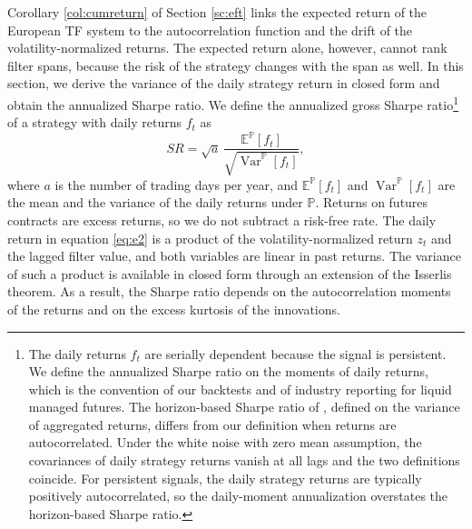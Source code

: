 \documentclass[hidelinks]{siamonline250211}
\DeclareMathOperator{\Var}{Var}
\begin{document}
Corollary \ref{col:cumreturn} of Section \ref{sc:eft} links the expected return of the European TF system to the autocorrelation function and the drift of the volatility-normalized returns. The expected return alone, however, cannot rank filter spans, because the risk of the strategy changes with the span as well. In this section, we derive the variance of the daily strategy return in closed form and obtain the annualized Sharpe ratio. We define the annualized gross Sharpe ratio\footnote{The daily returns $f_{t}$ are serially dependent because the signal is persistent. We define the annualized Sharpe ratio on the moments of daily returns, which is the convention of our backtests and of industry reporting for liquid managed futures. The horizon-based Sharpe ratio of \cite{Lo2002}, defined on the variance of aggregated returns, differs from our definition when returns are autocorrelated. Under the white noise with zero mean assumption, the covariances of daily strategy returns vanish at all lags and the two definitions coincide. For persistent signals, the daily strategy returns are typically positively autocorrelated, so the daily-moment annualization overstates the horizon-based Sharpe ratio.} of a strategy with daily returns $f_{t}$ as
\begin{equation} \label{eq:sr_def}
	SR = \sqrt{a} \, \frac{\mathbb{E}^{\mathbb{P}}[f_{t}]}{\sqrt{\Var^{\mathbb{P}}[f_{t}]}},
\end{equation}
where $a$ is the number of trading days per year, and $\mathbb{E}^{\mathbb{P}}[f_{t}]$ and $\Var^{\mathbb{P}}[f_{t}]$ are the mean and the variance of the daily returns under $\mathbb{P}$. Returns on futures contracts are excess returns, so we do not subtract a risk-free rate. The daily return in equation \eqref{eq:e2} is a product of the volatility-normalized return $z_{t}$ and the lagged filter value, and both variables are linear in past returns. The variance of such a product is available in closed form through an extension of the Isserlis theorem. As a result, the Sharpe ratio depends on the autocorrelation moments of the returns and on the excess kurtosis of the innovations.
\end{document}
